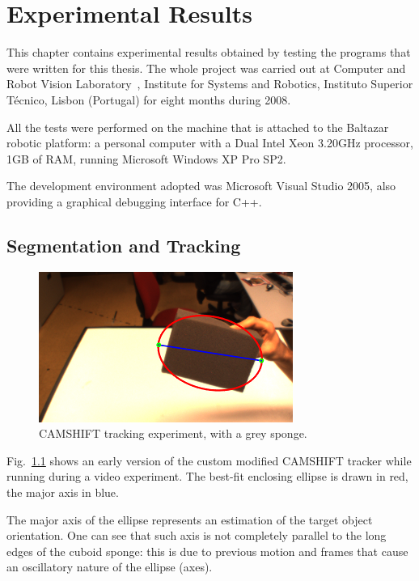 
\chapter{Experimental Results}
\label{chap:experimental_results}

This chapter contains experimental results obtained by testing the programs that were written for this thesis. The whole project was carried out at Computer and Robot Vision Laboratory~\cite{link:vislab}, Institute for Systems and Robotics, Instituto Superior T\'{e}cnico, Lisbon (Portugal) for eight months during 2008.

All the tests were performed on the machine that is attached to the Baltazar robotic platform: a personal computer with a Dual Intel Xeon 3.20GHz processor, 1GB of RAM, running Microsoft Windows XP Pro SP2.

The development environment adopted was Microsoft Visual Studio 2005, also providing a graphical debugging interface for C++.

\section{Segmentation and Tracking}

\begin{figure}[h]
\centering
\includegraphics{figures/0619grey}
\caption[\acs{CAMSHIFT} tracking experiment]{\ac{CAMSHIFT} tracking experiment, with a grey sponge.}
\label{img:0619grey}
\end{figure}

Fig.~\ref{img:0619grey} shows an early version of the custom modified \ac{CAMSHIFT} tracker while running during a video experiment. The best-fit enclosing ellipse is drawn in red, the major axis in blue.

The major axis of the ellipse represents an estimation of the target object orientation. One can see that such axis is not completely parallel to the long edges of the cuboid sponge: this is due to previous motion and frames that cause an oscillatory nature of the ellipse (axes).


